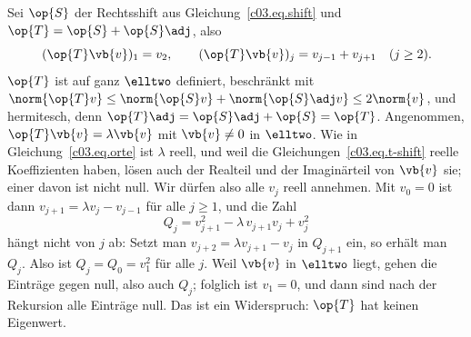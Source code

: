 \begin{vertiefung}[id=c03.v7,
    titel={Ein hermitescher Operator ohne Eigenvektoren},
    wozu={Im Kern lässt sich jeder hermitesche Operator diagonalisieren
      (Satz~\ref{c03.thm.spektral}). In unendlich vielen Dimensionen stimmt das nicht mehr: Hier
      ist ein beschränkter hermitescher Operator auf $\elltwo$, der keinen einzigen Eigenvektor
      hat, und das, was an die Stelle der Eigenbasis tritt.},
    voraussetzung={Satz~\ref{c03.thm.spektral}; Vertiefungen~\ref{c03.v1}, \ref{c03.v5}
      und~\ref{c03.v6} (der Rechtsshift). Der Kern bis Kapitel~4 braucht den Block nicht;
      Kapitel~5 nimmt das Thema mit Ort und Impuls wieder auf.},
    zurueck={In endlicher Dimension hat jeder hermitesche Operator eine Orthonormalbasis aus
      Eigenvektoren. In unendlich vielen Dimensionen kann ein hermitescher Operator ganz ohne
      Eigenvektoren sein; der allgemeine Spektralsatz ersetzt dann die Eigenbasis.}]
  \begin{example}\label{c03.ex.ohne-eigen}
    Sei $\op{S}$ der Rechtsshift aus Gleichung~\eqref{c03.eq.shift} und
    $\op{T} = \op{S} + \op{S}\adj$, also
    \begin{equation}\label{c03.eq.t-shift}
      (\op{T}\vb{v})_1 = v_2 ,
      \qquad
      (\op{T}\vb{v})_j = v_{j-1} + v_{j+1} \quad (j \geq 2) .
    \end{equation}
    $\op{T}$ ist auf ganz $\elltwo$ definiert, beschränkt mit
    $\norm{\op{T}v} \leq \norm{\op{S}v} + \norm{\op{S}\adj v} \leq 2\norm{v}$, und hermitesch,
    denn $\op{T}\adj = \op{S}\adj + \op{S} = \op{T}$. Angenommen, $\op{T}\vb{v} = \lambda\vb{v}$
    mit $\vb{v} \neq 0$ in $\elltwo$. Wie in Gleichung~\eqref{c03.eq.orte} ist $\lambda$ reell,
    und weil die Gleichungen~\eqref{c03.eq.t-shift} reelle Koeffizienten haben, lösen auch der
    Realteil und der Imaginärteil von $\vb{v}$ sie; einer davon ist nicht null. Wir dürfen also
    alle $v_j$ reell annehmen. Mit $v_0 = 0$ ist dann $v_{j+1} = \lambda v_j - v_{j-1}$ für alle
    $j \geq 1$, und die Zahl
    \begin{equation}\label{c03.eq.erhaltung}
      Q_j = v_{j+1}^2 - \lambda\, v_{j+1} v_j + v_j^2
    \end{equation}
    hängt nicht von $j$ ab: Setzt man $v_{j+2} = \lambda v_{j+1} - v_j$ in $Q_{j+1}$ ein, so
    erhält man $Q_j$. Also ist $Q_j = Q_0 = v_1^2$ für alle $j$. Weil $\vb{v}$ in $\elltwo$ liegt,
    gehen die Einträge gegen null, also auch $Q_j$; folglich ist $v_1 = 0$, und dann sind nach
    der Rekursion alle Einträge null. Das ist ein Widerspruch: $\op{T}$ hat keinen Eigenwert.
  \end{example}


\end{vertiefung}
